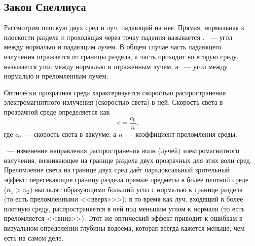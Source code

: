 \subsection{Закон Снеллиуса}
Рассмотрим плоскую  двух сред и луч, падающий на нее. Прямая, нормальная к плоскости раздела и проходящая через точку падения называется . ~--- угол между нормалью и падающим лучем. В общем случае часть падающего излучения отражается от границы раздела, а часть проходит во вторую среду.  называется угол между нормалью и отраженным лучем, а ~--- угол между нормалью и преломленным лучем.

Оптически прозрачная среда характеризуется скоростью распространения электромагнитного излучения (скоростью света) в ней. Скорость света в прозрачной среде определяется как
\begin{equation}
	c = \frac{c_0}{n},
\end{equation}
где $c_0$~--- скорость света в вакууме, а $n$~--- коэффициент преломления среды.

~--- изменение направления распространения волн (лучей) электромагнитного излучения, возникающее на границе раздела двух прозрачных для этих волн сред. Преломление света на границе двух сред даёт парадоксальный зрительный эффект: пересекающие границу раздела прямые предметы в более плотной среде ($n_1 >  n_2$) выглядят образующими больший угол с нормалью к границе раздела (то есть преломлёнными <<вверх»>>); в то время как луч, входящий в более плотную среду, распространяется в ней под меньшим углом к нормали (то есть преломляется <<вниз>>). Этот же оптический эффект приводит к ошибкам в визуальном определении глубины водоёма, которая всегда кажется меньше, чем есть на самом деле.


